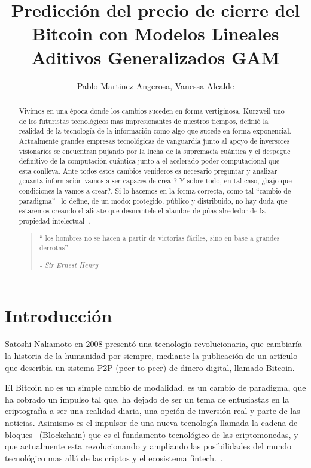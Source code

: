 \documentclass[a4paper,12pt,twocolumn]{article}
\date{ }
\title{\textbf{Predicción del precio de cierre del Bitcoin con Modelos Lineales Aditivos Generalizados GAM}}
\author{Pablo Martinez Angerosa, Vanessa Alcalde}
\begin{document}
\onecolumn

\maketitle
\begin{abstract}
Vivimos en una época donde los cambios suceden en forma vertiginosa. Kurzweil\cite{RayKurzweil} uno de los futuristas tecnológicos mas impresionantes de nuestros tiempos, definió la realidad de la tecnología de la información como algo que sucede en forma exponencial. Actualmente grandes empresas tecnológicas de vanguardia junto al apoyo de inversores visionarios se encuentran pujando por la lucha de la supremacía cuántica y el despegue definitivo de la computación cuántica junto a el  acelerado poder computacional que esta conlleva. Ante todos estos cambios venideros es necesario preguntar y analizar ¿cuanta información vamos a ser capaces de crear? Y sobre todo, en tal caso, ¿bajo que condiciones la vamos a crear?. Si lo hacemos en la forma correcta, como tal “cambio de paradigma”~\cite{LaSingularidad} lo define, de un modo: protegido, público y distribuido,  no hay duda que estaremos creando el alicate que desmantele el alambre de púas alrededor de la propiedad intelectual~\cite{ManifestoCriptoAnarquista}.
\begin{quotation}
“ los hombres no se hacen a partir de victorias fáciles, sino en base a grandes derrotas”
\begin{flushright}
{\it - Sir Ernest Henry }
\end{flushright}
\end{quotation}

\end{abstract}
\vspace{1.0cm}

\twocolumn

\section{Introducción}
 Satoshi Nakamoto en 2008 presentó una tecnología revolucionaria\cite{Satoshi}, que cambiaría la historia de la humanidad por siempre, mediante la publicación de un artículo que describía un sistema P2P (peer-to-peer) de dinero digital, llamado Bitcoin. 

El Bitcoin no es un simple cambio de modalidad, es un cambio de paradigma, que ha cobrado un impulso tal que, ha dejado de ser un tema de entusiastas en la criptografía a ser una realidad diaria, una opción de inversión real y parte de las noticias. Asimismo es el impulsor de una nueva tecnología llamada la cadena de bloques~\cite{Blockchain} (Blockchain) que es el fundamento tecnológico de las criptomonedas,  y que actualmente esta revolucionando y ampliando las posibilidades del mundo tecnológico mas allá de las criptos y el ecosistema fintech.~\cite{Bitcoin_revolucion_monetaria}. 
\end{document}
